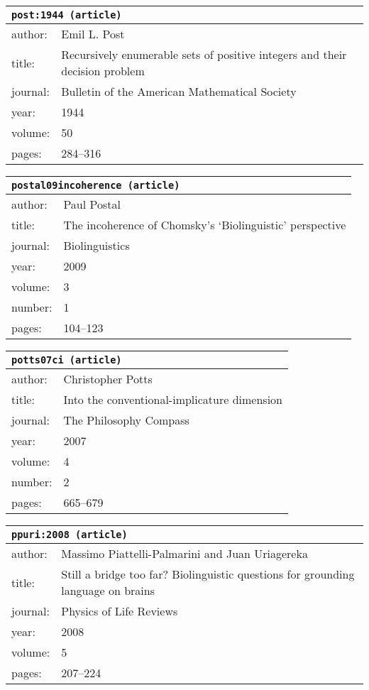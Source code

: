 \documentclass{article}
\begin{document}
\bigskip

\begin{tabular}{p{}p{}}
\multicolumn{2}{l}{\texttt{post:1944 (article)}}\\
\hline
author: & Emil L. Post\\
title: & Recursively enumerable sets of positive integers and their decision problem\\
journal: & Bulletin of the American Mathematical Society\\
year: & 1944\\
volume: & 50\\
pages: & 284--316\\
\end{tabular}

\bigskip

\begin{tabular}{p{}p{}}
\multicolumn{2}{l}{\texttt{postal09incoherence (article)}}\\
\hline
author: & Paul Postal\\
title: & The incoherence of Chomsky's `Biolinguistic' perspective\\
journal: & Biolinguistics\\
year: & 2009\\
volume: & 3\\
number: & 1\\
pages: & 104--123\\
\end{tabular}

\bigskip

\begin{tabular}{p{}p{}}
\multicolumn{2}{l}{\texttt{potts07ci (article)}}\\
\hline
author: & Christopher Potts\\
title: & Into the conventional-implicature dimension\\
journal: & The Philosophy Compass\\
year: & 2007\\
volume: & 4\\
number: & 2\\
pages: & 665--679\\
\end{tabular}

\bigskip

\begin{tabular}{p{}p{}}
\multicolumn{2}{l}{\texttt{ppuri:2008 (article)}}\\
\hline
author: & Massimo Piattelli-Palmarini and Juan Uriagereka\\
title: & Still a bridge too far? Biolinguistic questions for grounding language on brains\\
journal: & Physics of Life Reviews\\
year: & 2008\\
volume: & 5\\
pages: & 207--224\\
\end{tabular}
\end{document}
